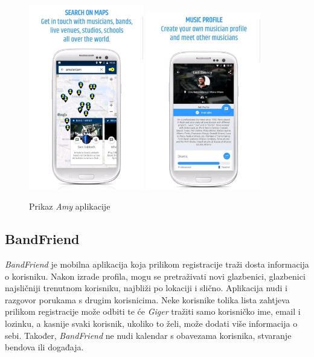 		\begin{figure}[H]
			\begin{center}
				\includegraphics[width=5cm]{slike/Amy.JPEG}
			\includegraphics[width=5cm]{slike/Amy2.JPEG}
			\end{center}
			\caption{Prikaz \textit{Amy} aplikacije}
			\label{fig:promjene2}
		\end{figure}
		
		
		
	    \subsection{BandFriend}
		
		\textit{BandFriend} je mobilna aplikacija koja prilikom registracije traži dosta informacija o korisniku. Nakon izrade profila, mogu se pretraživati novi glazbenici, glazbenici najsličniji trenutnom korisniku, najbliži po lokaciji i slično. Aplikacija nudi i razgovor porukama s drugim korisnicima. Neke korisnike tolika lista zahtjeva prilikom registracije može odbiti te će \textit{Giger} tražiti samo korisničko ime, email i lozinku, a kasnije svaki korisnik, ukoliko to želi, može dodati više informacija o sebi. Također, \textit{BandFriend} ne nudi kalendar s obavezama korisnika, stvaranje bendova ili događaja.
		\\
		
